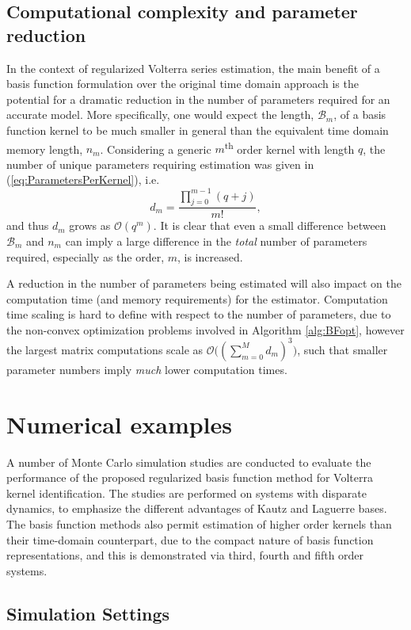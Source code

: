 \subsection{Computational complexity and parameter reduction}

In the context of regularized Volterra series estimation, the main benefit of a basis function formulation over the original time domain approach is the potential for a dramatic reduction in the number of parameters required for an accurate model. More specifically, one would expect the length, $\mathcal{B}_m$, of a basis function kernel to be much smaller in general than the equivalent time domain memory length, $n_m$. Considering a generic $m$\textsuperscript{th} order kernel with length $q$, the number of unique parameters requiring estimation was given in (\ref{eq:ParametersPerKernel}), i.e.  
$$d_m = \frac{\prod_{j=0}^{m-1}(q+j)}{m!},$$
and thus $d_m$ grows as $\mathcal{O}(q^m)$. It is clear that even a small difference between $\mathcal{B}_m$ and $n_m$ can imply a large difference in the \emph{total} number of parameters required, especially as the order, $m$, is increased. 

A reduction in the number of parameters being estimated will also impact on the computation time (and memory requirements) for the estimator. Computation time scaling is hard to define with respect to the number of parameters, due to the non-convex optimization problems involved in Algorithm \ref{alg:BFopt}, however the largest matrix computations scale as $\mathcal{O}\big((\sum_{m=0}^{M} d_m)^3\big)$, such that smaller parameter numbers imply \emph{much} lower computation times.

\section{Numerical examples}

A number of Monte Carlo simulation studies are conducted to evaluate the performance of the proposed regularized basis function method for Volterra kernel identification. The studies are performed on systems with disparate dynamics, to emphasize the different advantages of Kautz and Laguerre bases. The basis function methods also permit estimation of higher order kernels than their time-domain counterpart, due to the compact nature of basis function representations, and this is demonstrated via third, fourth and fifth order systems.

\subsection{Simulation Settings}


